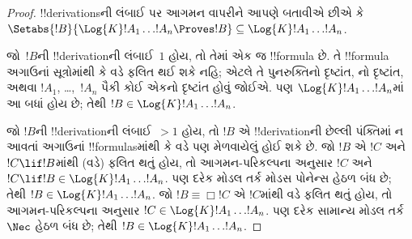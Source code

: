 \documentclass[../../../include/open-logic-section]{subfiles}
\begin{document}
\begin{proof}
  !!{derivation}sની લંબાઈ પર આગમન વાપરીને આપણે બતાવીએ છીએ કે
  $\Setabs{!B}{\Log{K} !A_1 \dots !A_n \Proves !B} \subseteq
  \Log{K} !A_1 \dots !A_n$.

  જો~$!B$ની !!{derivation}ની લંબાઈ~$1$ હોય, તો તેમાં એક જ !!{formula}
  છે. તે !!{formula} અગાઉનાં સૂત્રોમાંથી \MP{} કે \Nec વડે ફલિત થઈ
  શકે નહિ; એટલે તે પુનરુક્તિનો દૃષ્ટાંત, નો દૃષ્ટાંત, અથવા $!A_1$, \dots,~$!A_n$ પૈકી કોઈ એકનો
  દૃષ્ટાંત હોવું જોઈએ. પણ $\Log{K}!A_1\dots!A_n$માં આ બધાં હોય છે;
  તેથી $!B \in \Log{K}!A_1 \dots !A_n$.

  જો $!B$ની !!{derivation}ની લંબાઈ~$> 1$ હોય, તો $!B$ એ !!{derivation}ની
  છેલ્લી પંક્તિમાં ન આવતાં અગાઉનાં !!{formula}sમાંથી \MP{} કે \Nec{}
  વડે પણ મેળવાયેલું હોઈ શકે છે. જો $!B$ એ $!C$ અને $!C \lif !B$માંથી
  (\MP વડે) ફલિત થતું હોય, તો આગમન-પરિકલ્પના અનુસાર $!C$ અને $!C \lif !B \in
  \Log{K}!A_1 \dots !A_n$. પણ દરેક મોડલ તર્ક મોડસ પોનેન્સ હેઠળ બંધ
  છે; તેથી $!B \in \Log{K}!A_1 \dots
  !A_n$. જો $!B \equiv \Box !C$ એ $!C$માંથી \Nec વડે ફલિત થતું હોય,
  તો આગમન-પરિકલ્પના અનુસાર $!C
  \in \Log{K}!A_1 \dots !A_n$. પણ દરેક સામાન્ય મોડલ તર્ક $\Nec$
  હેઠળ બંધ છે; તેથી $!B \in
  \Log{K}!A_1\dots!A_n$.


\end{proof}
\end{document}
